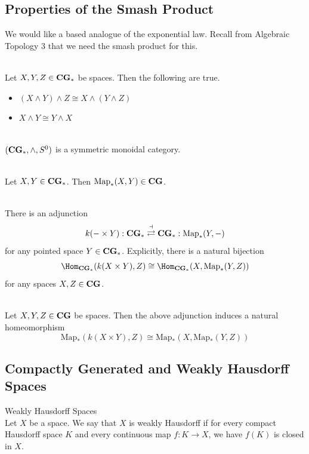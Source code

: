 \documentclass[a4paper]{article}
\begin{document}
\subsection{Properties of the Smash Product}
We would like a based analogue of the exponential law. Recall from Algebraic Topology 3 that we need the smash product for this. 

\begin{prp}{}{}\\
Let $X,Y,Z\in\bold{CG}_\ast$ be spaces. Then the following are true. 
\begin{itemize}
\item $(X\wedge Y)\wedge Z\cong X\wedge(Y\wedge Z)$
\item $X\wedge Y\cong Y\wedge X$
\end{itemize}
\end{prp}

\begin{prp}{}{}\\
$(\bold{CG}_\ast,\wedge,S^0)$ is a symmetric monoidal category. 
\end{prp}

\begin{prp}{}{}\\
Let $X,Y\in\bold{CG}_\ast$. Then $\text{Map}_\ast(X,Y)\in\bold{CG}$. 
\end{prp}

\begin{prp}{}{}\\
There is an adjunction $$k(-\times Y):\bold{CG}_\ast\overset{\dashv}{\rightleftarrows}\bold{CG}_\ast:\text{Map}_\ast(Y,-)$$ for any pointed space $Y\in\bold{CG}_\ast$. Explicitly, there is a natural bijection $$\Hom_{\bold{CG}_\ast}(k(X\times Y),Z)\cong\Hom_{\bold{CG}_\ast}(X,\text{Map}_\ast(Y,Z))$$ for any spaces $X,Z\in\bold{CG}$. 
\end{prp}

\begin{prp}{}{}\\
Let $X,Y,Z\in\bold{CG}$ be spaces. Then the above adjunction induces a natural homeomorphism $$\text{Map}_\ast(k(X\times Y),Z)\cong\text{Map}_\ast(X,\text{Map}_\ast(Y,Z))$$
\end{prp}

\subsection{Compactly Generated and Weakly Hausdorff Spaces}
\begin{defn}{Weakly Hausdorff Spaces}{}\\
Let $X$ be a space. We say that $X$ is weakly Hausdorff if for every compact Hausdorff space $K$ and every continuous map $f:K\to X$, we have $f(K)$ is closed in $X$. 
\end{defn}
\end{document}
